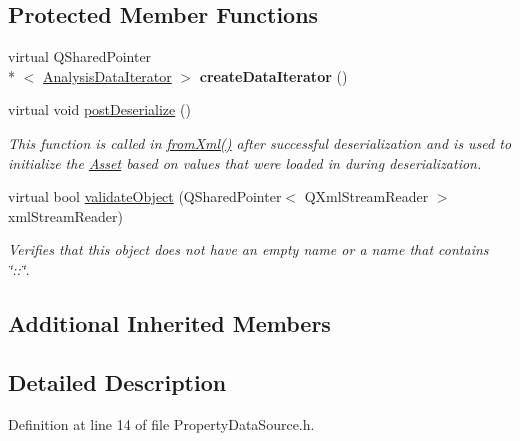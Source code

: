 \subsection*{Protected Member Functions}
\begin{DoxyCompactItemize}
\item 
\hypertarget{class_picto_1_1_property_data_source_af1a18ae0edce4283eac2fe4e7d008760}{virtual Q\-Shared\-Pointer\\*
$<$ \hyperlink{class_picto_1_1_analysis_data_iterator}{Analysis\-Data\-Iterator} $>$ {\bfseries create\-Data\-Iterator} ()}\label{class_picto_1_1_property_data_source_af1a18ae0edce4283eac2fe4e7d008760}

\item 
virtual void \hyperlink{class_picto_1_1_property_data_source_a8370e743f3590aeee82486757d2df307}{post\-Deserialize} ()
\begin{DoxyCompactList}\small\item\em This function is called in \hyperlink{class_picto_1_1_asset_a8bed4da09ecb1c07ce0dab313a9aba67}{from\-Xml()} after successful deserialization and is used to initialize the \hyperlink{class_picto_1_1_asset}{Asset} based on values that were loaded in during deserialization. \end{DoxyCompactList}\item 
\hypertarget{class_picto_1_1_property_data_source_ac51a648a0e82ecf3d15ab9725e38e92a}{virtual bool \hyperlink{class_picto_1_1_property_data_source_ac51a648a0e82ecf3d15ab9725e38e92a}{validate\-Object} (Q\-Shared\-Pointer$<$ Q\-Xml\-Stream\-Reader $>$ xml\-Stream\-Reader)}\label{class_picto_1_1_property_data_source_ac51a648a0e82ecf3d15ab9725e38e92a}

\begin{DoxyCompactList}\small\item\em Verifies that this object does not have an empty name or a name that contains \char`\"{}\-::\char`\"{}. \end{DoxyCompactList}\end{DoxyCompactItemize}
\subsection*{Additional Inherited Members}


\subsection{Detailed Description}


Definition at line 14 of file Property\-Data\-Source.\-h.



